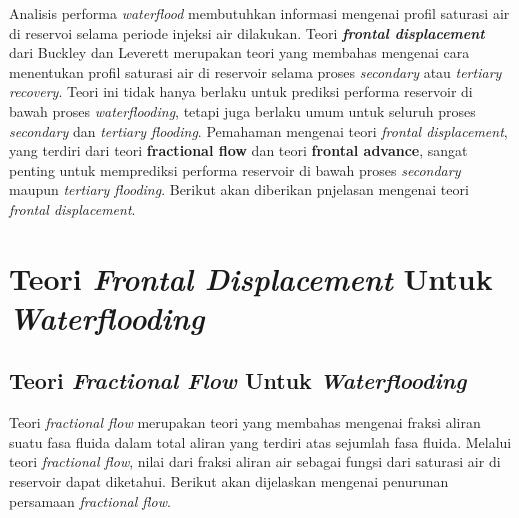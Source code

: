 \documentclass[
]{book}
\begin{document}
Analisis performa \emph{waterflood} membutuhkan informasi mengenai profil saturasi air di reservoi selama periode injeksi air dilakukan. Teori \textbf{\emph{frontal displacement}} dari Buckley dan Leverett merupakan teori yang membahas mengenai cara menentukan profil saturasi air di reservoir selama proses \emph{secondary} atau \emph{tertiary recovery}. Teori ini tidak hanya berlaku untuk prediksi performa reservoir di bawah proses \emph{waterflooding}, tetapi juga berlaku umum untuk seluruh proses \emph{secondary} dan \emph{tertiary flooding}. Pemahaman mengenai teori \emph{frontal displacement}, yang terdiri dari teori \textbf{fractional flow} dan teori \textbf{frontal advance}, sangat penting untuk memprediksi performa reservoir di bawah proses \emph{secondary} maupun \emph{tertiary flooding}. Berikut akan diberikan pnjelasan mengenai teori \emph{frontal displacement}.

\hypertarget{teori-frontal-displacement-untuk-waterflooding}{%
\section{\texorpdfstring{Teori \emph{Frontal Displacement} Untuk \emph{Waterflooding}}{Teori Frontal Displacement Untuk Waterflooding}}\label{teori-frontal-displacement-untuk-waterflooding}}

\hypertarget{teori-fractional-flow-untuk-waterflooding}{%
\subsection{\texorpdfstring{Teori \emph{Fractional Flow} Untuk \emph{Waterflooding}}{Teori Fractional Flow Untuk Waterflooding}}\label{teori-fractional-flow-untuk-waterflooding}}

Teori \emph{fractional flow} merupakan teori yang membahas mengenai fraksi aliran suatu fasa fluida dalam total aliran yang terdiri atas sejumlah fasa fluida. Melalui teori \emph{fractional flow}, nilai dari fraksi aliran air sebagai fungsi dari saturasi air di reservoir dapat diketahui. Berikut akan dijelaskan mengenai penurunan persamaan \emph{fractional flow}.
\end{document}
